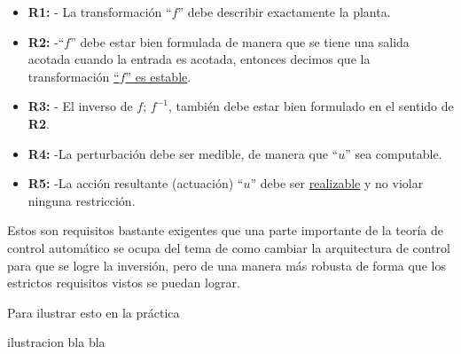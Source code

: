 \documentclass[a4paper]{article}
\begin{document}
\begin{itemize}
		\item \textbf{R1:} - La transformación ``$f$'' debe describir exactamente la planta.
		\item \textbf{R2:} -``$f$'' debe estar bien formulada de manera que se tiene una salida acotada cuando la entrada es acotada, entonces decimos que la transformación \underline{``$f$'' es estable}.
		\item \textbf{R3:} - El inverso de $f$; $f^{-1}$, también debe estar bien formulado en el sentido de \textbf{R2}.
		\item \textbf{R4:} -La perturbación debe ser medible, de manera que ``$u$'' sea computable.
		\item \textbf{R5:} -La acción resultante (actuación) ``$u$'' debe ser \underline{realizable} y no violar ninguna restricción.
\end{itemize}

Estos son requisitos bastante exigentes que una parte importante de la teoría de control automático se ocupa del tema de como cambiar la arquitectura de control para que se logre la inversión, pero de una manera más robusta de forma que los estrictos requisitos vistos se puedan lograr.

Para ilustrar esto en la práctica

ilustracion bla bla
\end{document}
